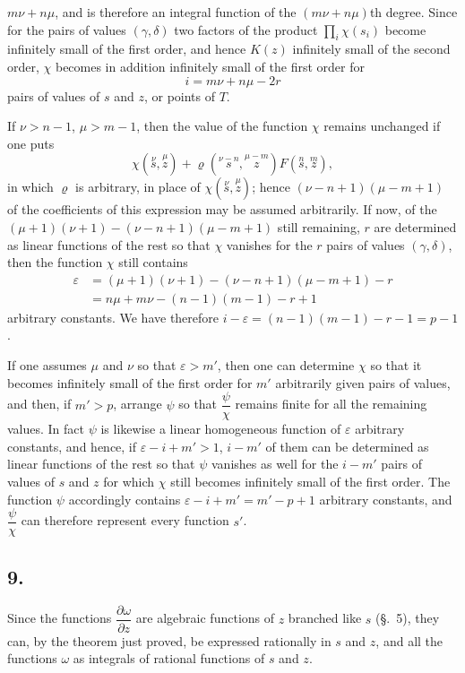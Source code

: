 \documentclass{article}
\begin{document}
$m\nu + n\mu$, and is therefore an integral function of the $(m\nu + n\mu)$th degree. Since for the pairs of values $(\gamma, \delta)$ two factors of the product $\displaystyle\prod_{i} \chi(s_{i})$ become infinitely small of the first order, and hence $K(z)$ infinitely small of the second order, $\chi$ becomes in addition infinitely small of the first order for
\[ i = m\nu + n\mu - 2r \]
pairs of values of $s$ and $z$, or points of $T$.

If $\nu > n-1$, $\mu > m-1$, then the value of the function $\chi$ remains unchanged if one puts
\[ \chi(\overset{\nu}{s}, \overset{\mu}{z}) + \varrho(\overset{\nu-n}{s}, \overset{\mu-m}{z}) F(\overset{n}{s}, \overset{m}{z}), \]
in which $\varrho$ is arbitrary, in place of $\chi(\overset{\nu}{s}, \overset{\mu}{z})$; hence $(\nu-n+1)(\mu-m+1)$ of the coefficients of this expression may be assumed arbitrarily. If now, of the $(\mu+1)(\nu+1) - (\nu-n+1)(\mu-m+1)$ still remaining, $r$ are determined as linear functions of the rest so that $\chi$ vanishes for the $r$ pairs of values $(\gamma, \delta)$, then the function $\chi$ still contains
\[
\begin{aligned}
\varepsilon &= (\mu+1)(\nu+1) - (\nu-n+1)(\mu-m+1) - r \\
&= n\mu + m\nu - (n-1)(m-1) - r + 1
\end{aligned}
\]
arbitrary constants. We have therefore $i - \varepsilon = (n-1)(m-1) - r - 1 = p-1$.

If one assumes $\mu$ and $\nu$ so that $\varepsilon > m'$, then one can determine $\chi$ so that it becomes infinitely small of the first order for $m'$ arbitrarily given pairs of values, and then, if $m' > p$, arrange $\psi$ so that $\dfrac{\psi}{\chi}$ remains finite for all the remaining values. In fact $\psi$ is likewise a linear homogeneous function of $\varepsilon$ arbitrary constants, and hence, if $\varepsilon - i + m' > 1$, $i - m'$ of them can be determined as linear functions of the rest so that $\psi$ vanishes as well for the $i - m'$ pairs of values of $s$ and $z$ for which $\chi$ still becomes infinitely small of the first order. The function $\psi$ accordingly contains $\varepsilon - i + m' = m' - p + 1$ arbitrary constants, and $\dfrac{\psi}{\chi}$ can therefore represent every function $s'$.

\subsection*{9.}

Since the functions $\dfrac{\partial\omega}{\partial z}$ are algebraic functions of $z$ branched like $s$ (§.~5), they can, by the theorem just proved, be expressed rationally in $s$ and $z$, and all the functions $\omega$ as integrals of rational functions of $s$ and $z$.
\end{document}
